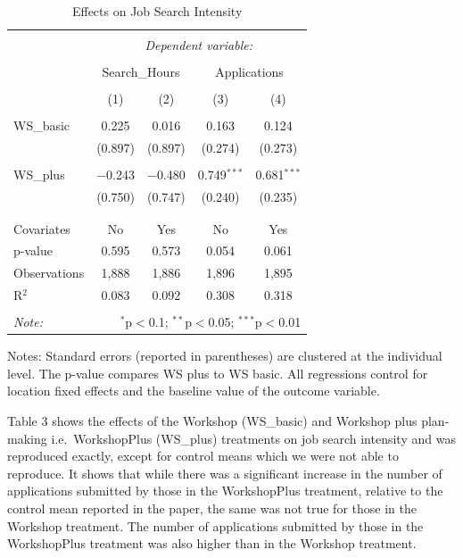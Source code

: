 \documentclass[]{elsarticle} %
\begin{document}
\begin{table}[H] \centering 
  \caption{Effects on Job Search Intensity} 
  \label{} 
\begin{tabular}{@{\extracolsep{5pt}}lcccc} 
\\[-1.8ex]\hline 
\hline \\[-1.8ex] 
 & \multicolumn{4}{c}{\textit{Dependent variable:}} \\ 
\cline{2-5} 
\\[-1.8ex] & \multicolumn{2}{c}{Search\_Hours} & \multicolumn{2}{c}{Applications} \\ 
\\[-1.8ex] & (1) & (2) & (3) & (4)\\ 
\hline \\[-1.8ex] 
 WS\_basic & 0.225 & 0.016 & 0.163 & 0.124 \\ 
  & (0.897) & (0.897) & (0.274) & (0.273) \\ 
  & & & & \\ 
 WS\_plus & $-$0.243 & $-$0.480 & 0.749$^{***}$ & 0.681$^{***}$ \\ 
  & (0.750) & (0.747) & (0.240) & (0.235) \\ 
  & & & & \\ 
\hline \\[-1.8ex] 
Covariates & No & Yes & No & Yes \\ 
p-value & 0.595 & 0.573 & 0.054 & 0.061 \\ 
Observations & 1,888 & 1,886 & 1,896 & 1,895 \\ 
R$^{2}$ & 0.083 & 0.092 & 0.308 & 0.318 \\ 
\hline 
\hline \\[-1.8ex] 
\textit{Note:}  & \multicolumn{4}{r}{$^{*}$p$<$0.1; $^{**}$p$<$0.05; $^{***}$p$<$0.01} \\ 
\end{tabular} 
\end{table}

Notes: Standard errors (reported in parentheses) are clustered at the
individual level. The p-value compares WS plus to WS basic. All
regressions control for location fixed effects and the baseline value of
the outcome variable.

Table 3 shows the effects of the Workshop (WS\_basic) and Workshop plus
plan-making i.e.~WorkshopPlus (WS\_plus) treatments on job search
intensity and was reproduced exactly, except for control means which we
were not able to reproduce. It shows that while there was a significant
increase in the number of applications submitted by those in the
WorkshopPlus treatment, relative to the control mean reported in the
paper, the same was not true for those in the Workshop treatment. The
number of applications submitted by those in the WorkshopPlus treatment
was also higher than in the Workshop treatment.
\end{document}
